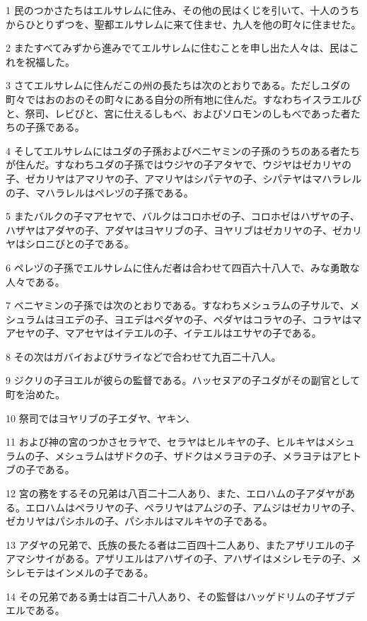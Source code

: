 \par 1 民のつかさたちはエルサレムに住み、その他の民はくじを引いて、十人のうちからひとりずつを、聖都エルサレムに来て住ませ、九人を他の町々に住ませた。
\par 2 またすべてみずから進みでてエルサレムに住むことを申し出た人々は、民はこれを祝福した。
\par 3 さてエルサレムに住んだこの州の長たちは次のとおりである。ただしユダの町々ではおのおのその町々にある自分の所有地に住んだ。すなわちイスラエルびと、祭司、レビびと、宮に仕えるしもべ、およびソロモンのしもべであった者たちの子孫である。
\par 4 そしてエルサレムにはユダの子孫およびベニヤミンの子孫のうちのある者たちが住んだ。すなわちユダの子孫ではウジヤの子アタヤで、ウジヤはゼカリヤの子、ゼカリヤはアマリヤの子、アマリヤはシパテヤの子、シパテヤはマハラレルの子、マハラレルはペレヅの子孫である。
\par 5 またバルクの子マアセヤで、バルクはコロホゼの子、コロホゼはハザヤの子、ハザヤはアダヤの子、アダヤはヨヤリブの子、ヨヤリブはゼカリヤの子、ゼカリヤはシロニびとの子である。
\par 6 ペレヅの子孫でエルサレムに住んだ者は合わせて四百六十八人で、みな勇敢な人々である。
\par 7 ベニヤミンの子孫では次のとおりである。すなわちメシュラムの子サルで、メシュラムはヨエデの子、ヨエデはペダヤの子、ペダヤはコラヤの子、コラヤはマアセヤの子、マアセヤはイテエルの子、イテエルはエサヤの子である。
\par 8 その次はガバイおよびサライなどで合わせて九百二十八人。
\par 9 ジクリの子ヨエルが彼らの監督である。ハッセヌアの子ユダがその副官として町を治めた。
\par 10 祭司ではヨヤリブの子エダヤ、ヤキン、
\par 11 および神の宮のつかさセラヤで、セラヤはヒルキヤの子、ヒルキヤはメシュラムの子、メシュラムはザドクの子、ザドクはメラヨテの子、メラヨテはアヒトブの子である。
\par 12 宮の務をするその兄弟は八百二十二人あり、また、エロハムの子アダヤがある。エロハムはペラリヤの子、ペラリヤはアムジの子、アムジはゼカリヤの子、ゼカリヤはパシホルの子、パシホルはマルキヤの子である。
\par 13 アダヤの兄弟で、氏族の長たる者は二百四十二人あり、またアザリエルの子アマシサイがある。アザリエルはアハザイの子、アハザイはメシレモテの子、メシレモテはインメルの子である。
\par 14 その兄弟である勇士は百二十八人あり、その監督はハッゲドリムの子ザブデエルである。
